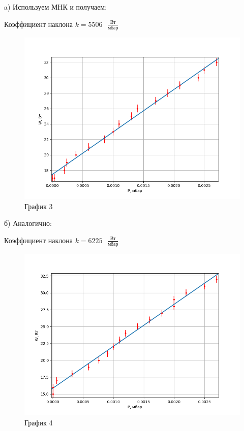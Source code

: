 \documentclass[a4paper,12pt]{article} %
\begin{document}
\begin{enumerate}
a) Используем МНК и получаем:

Коэффициент наклона $k = 5506\text{ }\frac{\text{Вт}}{\text{мбар}}$

\begin{figure}[h!]
	\centering
	\includegraphics[scale=0.8]{W(P) повыш.png}
	\caption*{График 3}
\end{figure}

\newpage
б) Аналогично:

Коэффициент наклона $k = 6225\text{ }\frac{\text{Вт}}{\text{мбар}}$

\begin{figure}[h!]
	\centering
	\includegraphics[scale=0.8]{W(P) пониж.png}
	\caption*{График 4}
\end{figure}


\end{enumerate}
\end{document}
